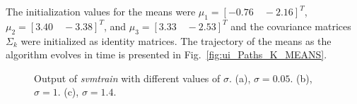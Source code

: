 \documentclass[letterpaper, 10 pt, conference]{ieeeconf}  %
\begin{document}
 The initialization values for the means were $\mu_{1} = [ -0.76 \quad -2.16] ^T$, $\mu_{2} = [3.40  \quad -3.38] ^T$, and $\mu_{3} = [3.33 \quad -2.53] ^T$ and the covariance matrices $\Sigma_{k}$ were initialized as identity matrices. The trajectory of the means as the algorithm evolves in time is presented in Fig.~\ref{fig:ui_Paths_K_MEANS}.
\begin{figure}[ht!]
 \begin{center}
         \caption{Output of \emph{svmtrain} with different values of $\sigma$. (a), $\sigma = 0.05$. (b), $\sigma = 1$. (c), $\sigma = 1.4$.}
 \end{center}
\end{figure}
\end{document}
